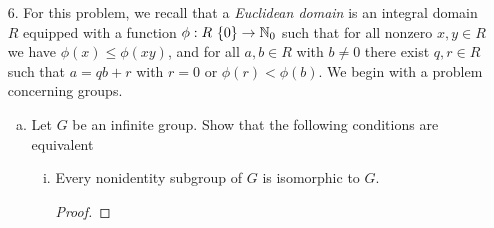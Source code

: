 \begin{itemize}
\begin{enumerate}[(a)]
\begin{proof}
\end{proof}


\item Show that if $x \in N_G(H)$, the normalizer of $H$, then $Hg \mapsto Hxg$ is a
well-defined bijection on right cosets.
\begin{proof}

\end{proof}


\item Show that $Hg \mapsto Hxg$ is $G$-equivariant if and only if $x \in N_G(H)$.
\begin{proof}
        
\end{proof}


\item Show that $x, y \in N_G(H)$ define the same equivariant bijection if and
only if they are in the same right coset of $H$.
\begin{proof}

\end{proof}


\item Show that $\text{Eq}_G(S) \cong N_G(H)/H$.
\begin{proof}

\end{proof}


\end{enumerate}






\item[6.] For this problem, we recall that a \textit{Euclidean domain} is an integral domain $R$
equipped with a function $\phi : R \ \{0\} \rightarrow \mathbb{N}_0$ such that for all nonzero $x, y \in R$
we have $\phi(x) \leq \phi(xy)$, and for all $a, b \in R$ with $b \neq 0$ there exist $q, r \in R$ such that
$a = qb + r$ with $r = 0$ or $\phi(r) < \phi(b)$. We begin with a problem concerning groups.
\begin{enumerate}[(a)]
\item Let $G$ be an infinite group. Show that the following conditions are
equivalent
    \begin{enumerate}[(i)]
        \item Every nonidentity subgroup of $G$ is isomorphic to $G$.
        \begin{proof}
        
        \end{proof}
        

\end{enumerate}
\end{enumerate}
\end{itemize}
